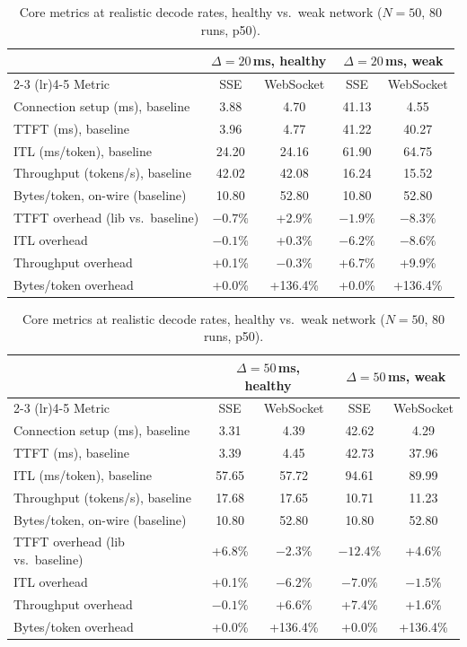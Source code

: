 \documentclass[11pt]{article}
\begin{document}
\begin{table}[H]
\centering\footnotesize
\caption{Core metrics at realistic decode rates, healthy vs.\ weak network ($N=50$, 80 runs, p50).}
\label{tab:stream-net20}
\begin{tabular}{@{}lcccc@{}}
\toprule
 & \multicolumn{2}{c}{$\Delta=20$\,ms, healthy} & \multicolumn{2}{c}{$\Delta=20$\,ms, weak} \\
\cmidrule(lr){2-3} \cmidrule(lr){4-5}
Metric & SSE & WebSocket & SSE & WebSocket \\
\midrule
Connection setup (ms), baseline & 3.88 & 4.70 & 41.13 & 4.55 \\
TTFT (ms), baseline & 3.96 & 4.77 & 41.22 & 40.27 \\
ITL (ms/token), baseline & 24.20 & 24.16 & 61.90 & 64.75 \\
Throughput (tokens/s), baseline & 42.02 & 42.08 & 16.24 & 15.52 \\
Bytes/token, on-wire (baseline) & 10.80 & 52.80 & 10.80 & 52.80 \\
\midrule
TTFT overhead (lib vs.\ baseline) & $-0.7\%$ & +2.9\% & $-1.9\%$ & $-8.3\%$ \\
ITL overhead & $-0.1\%$ & +0.3\% & $-6.2\%$ & $-8.6\%$ \\
Throughput overhead & +0.1\% & $-0.3\%$ & +6.7\% & +9.9\% \\
Bytes/token overhead & +0.0\% & +136.4\% & +0.0\% & +136.4\% \\
\bottomrule
\end{tabular}

\vspace{2mm}
\begin{tabular}{@{}lcccc@{}}
\toprule
 & \multicolumn{2}{c}{$\Delta=50$\,ms, healthy} & \multicolumn{2}{c}{$\Delta=50$\,ms, weak} \\
\cmidrule(lr){2-3} \cmidrule(lr){4-5}
Metric & SSE & WebSocket & SSE & WebSocket \\
\midrule
Connection setup (ms), baseline & 3.31 & 4.39 & 42.62 & 4.29 \\
TTFT (ms), baseline & 3.39 & 4.45 & 42.73 & 37.96 \\
ITL (ms/token), baseline & 57.65 & 57.72 & 94.61 & 89.99 \\
Throughput (tokens/s), baseline & 17.68 & 17.65 & 10.71 & 11.23 \\
Bytes/token, on-wire (baseline) & 10.80 & 52.80 & 10.80 & 52.80 \\
\midrule
TTFT overhead (lib vs.\ baseline) & +6.8\% & $-2.3\%$ & $-12.4\%$ & +4.6\% \\
ITL overhead & +0.1\% & $-6.2\%$ & $-7.0\%$ & $-1.5\%$ \\
Throughput overhead & $-0.1\%$ & +6.6\% & +7.4\% & +1.6\% \\
Bytes/token overhead & +0.0\% & +136.4\% & +0.0\% & +136.4\% \\
\bottomrule
\end{tabular}
\end{table}
\end{document}
